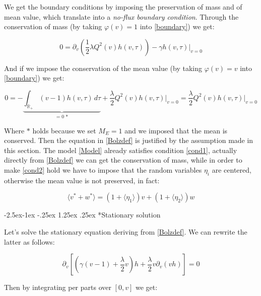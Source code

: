 \documentclass[12pt,a4paper]{article}
\makeatletter
\renewcommand\paragraph{\@startsection{paragraph}{0}{\z@}%
            {-2.5ex\@plus -1ex \@minus -.25ex}%
            {1.25ex \@plus .25ex}%
            {\normalfont\normalsize\bfseries}}
\numberwithin{theorem}{section}
\numberwithin{definition}{section}
\numberwithin{example}{section}
\numberwithin{exercise}{section}
\newcommand{\R}{\mathbb{R}}
\makeatother
\begin{document}
We get the boundary conditions by imposing the preservation of mass and of mean value, which translate into a \textit{no-flux boundary condition}. Through the conservation of mass (by taking $\varphi(v)=1$ into \ref{boundary}) we get:

\begin{equation}\label{cond1}
    0=\partial_v\left(\frac{1}{2}\lambda Q^2(v)h(v,\tau)\right)-\gamma h(v,\tau)\bigg|_{v=0}
\end{equation}

And if we impose the conservation of the mean value (by taking $\varphi(v)=v$ into \ref{boundary}) we get:

\begin{equation}\label{cond2}
0=-\underbrace{\int_{\R_+}(v-1)h(v,\tau) \,d\tau}_{=0\,\ast}+\frac{\lambda}{2}Q^2(v)h(v,\tau)\bigg|_{v=0}=\frac{\lambda}{2}Q^2(v)h(v,\tau)\bigg|_{v=0}
\end{equation}

Where $\ast$ holds because we set $M_E=1$ and we imposed that the mean is conserved. Then the equation in \ref{Bolzdef} is justified by the assumption made in this section. The model \ref{Model} already satisfies condition \ref{cond1}, actually directly from \ref{Bolzdef} we can get the conservation of mass, while in order to make \ref{cond2} hold we have to impose that the random variables $\eta_i$ are centered, otherwise the mean value is not preserved, in fact:

\[\langle v^{*}+w^{*}\rangle=(1+\langle\eta_1\rangle)v +(1+\langle\eta_2\rangle)w\]

\paragraph*{Stationary solution}

Let's solve the stationary equation deriving from \ref{Bolzdef}. We can rewrite the latter as follows:

\[\partial_v\left[\left(\gamma(v-1)+\frac{\lambda}{2}v\right)h+\frac{\lambda}{2}v\partial_v(vh)\right]=0\]



Then by integrating per parts over $[0,v]$ we get:
\end{document}
